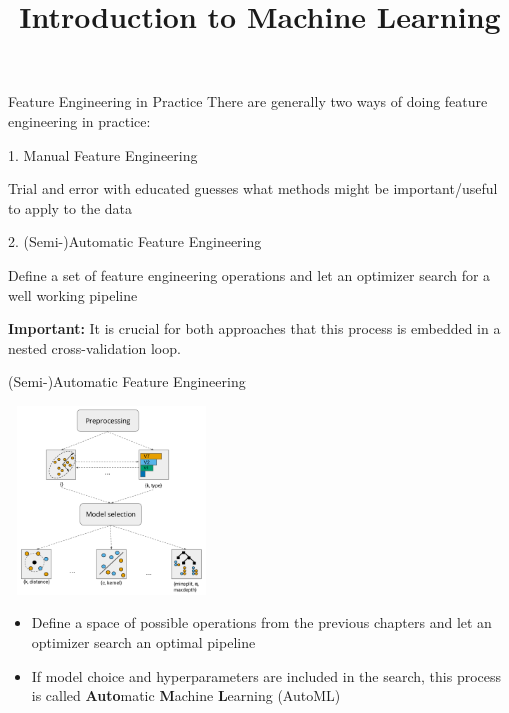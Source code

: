 



\newcommand{\titlefigure}{figure_man/automl2.png}
\newcommand{\learninggoals}{
  \item ...
  \item ...
}

\title{Introduction to Machine Learning}
\date{}




\begin{vbframe}{Feature Engineering in Practice}
    There are generally two ways of doing feature engineering in practice:
    \medskip
    
    1. Manual Feature Engineering
    \medskip
    
    Trial and error with educated guesses what methods might be important/useful to apply to the data
    
    \vspace*{1cm}
    
    2. (Semi-)Automatic Feature Engineering
    \medskip
    
    Define a set of feature engineering operations and let an optimizer search for a well working pipeline
    
    \vspace*{1cm}
    
    \textbf{Important:} It is crucial for both approaches that this process is embedded in a nested cross-validation loop.
\end{vbframe}

\begin{vbframe}{(Semi-)Automatic Feature Engineering}
    \begin{center}
        \includegraphics[width= 5.5cm, height=5cm]{figure_man/dag.png}
    \end{center}
    
    \begin{itemize}
        \item Define a space of possible operations from the previous chapters and let an optimizer search an optimal pipeline
        \item If model choice and hyperparameters are included in the search, this process is called \textbf{Auto}matic \textbf{M}achine \textbf{L}earning (AutoML)
    \end{itemize}
\end{vbframe}

